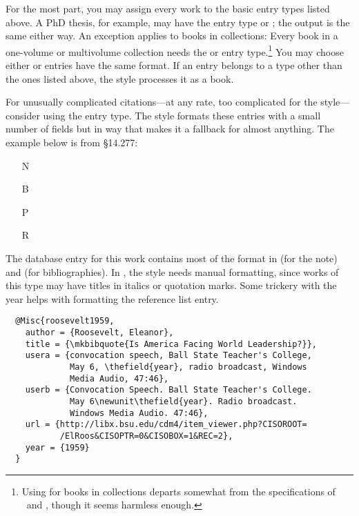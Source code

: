 \documentclass[11pt,letterpaper,oneside]{article}
\begin{document}
\noindent For the most part, you may assign every work to the basic
entry types listed above. A PhD thesis, for example, may have the
entry type  or ; the output is the
same either way. An exception applies to books in collections: Every
book in a one-volume or multivolume collection needs the
 or  entry type.\footnote{Using
 for books in collections departs somewhat from the
specifications of \BibTeX\ and \biblatex, though it seems harmless
enough.} You may choose either  or
 entries have the same format. If an entry belongs
to a type other than the ones listed above, the style processes it as
a book.

For unusually complicated ci\-ta\-tions---at any rate, too complicated
for the style---consider using the  entry type. The
style formats these entries with a small number of fields but in way
that makes it a fallback for almost anything. The example below is
from \S14.277:

\begin{itemize}
\item[N] 

\item[B] 

\item[P] 

\item[R] 
\end{itemize}

\noindent The database entry for this work contains most of the format
in  (for the note) and  (for
bibliographies). In , the style needs manual
formatting, since works of this type may have titles in italics or
quotation marks. Some trickery with the year helps with formatting the
reference list entry.

\begin{lstlisting}
  @Misc{roosevelt1959,
    author = {Roosevelt, Eleanor},
    title = {\mkbibquote{Is America Facing World Leadership?}},
    usera = {convocation speech, Ball State Teacher's College,
             May 6, \thefield{year}, radio broadcast, Windows
             Media Audio, 47:46},
    userb = {Convocation Speech. Ball State Teacher's College.
             May 6\newunit\thefield{year}. Radio broadcast.
             Windows Media Audio. 47:46},
    url = {http://libx.bsu.edu/cdm4/item_viewer.php?CISOROOT=
           /ElRoos&CISOPTR=0&CISOBOX=1&REC=2},
    year = {1959}
  }
\end{lstlisting}
\end{document}
